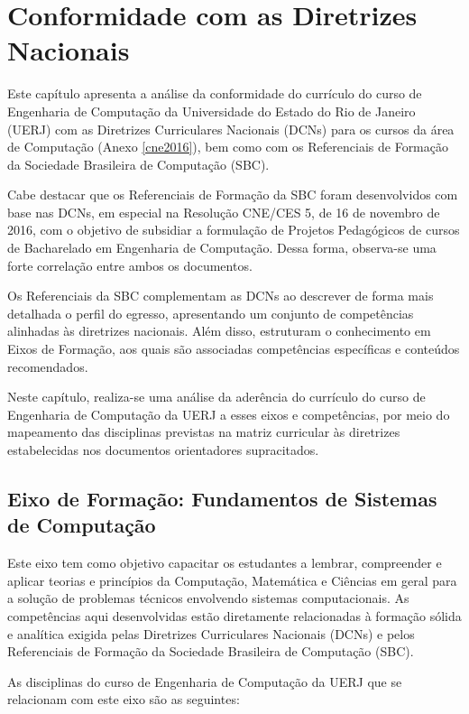 \chapter{Conformidade com as Diretrizes Nacionais}
\thispagestyle{plain}

Este capítulo apresenta a análise da conformidade do currículo do curso de Engenharia de Computação da Universidade do Estado do Rio de Janeiro (UERJ) com as Diretrizes Curriculares Nacionais (DCNs) para os cursos da área de Computação (Anexo \ref{cne2016}), bem como com os Referenciais de Formação da Sociedade Brasileira de Computação (SBC).

Cabe destacar que os Referenciais de Formação da SBC foram desenvolvidos com base nas DCNs, em especial na Resolução CNE/CES  5, de 16 de novembro de 2016, com o objetivo de subsidiar a formulação de Projetos Pedagógicos de cursos de Bacharelado em Engenharia de Computação. Dessa forma, observa-se uma forte correlação entre ambos os documentos.

Os Referenciais da SBC complementam as DCNs ao descrever de forma mais detalhada o perfil do egresso, apresentando um conjunto de competências alinhadas às diretrizes nacionais. Além disso, estruturam o conhecimento em Eixos de Formação, aos quais são associadas competências específicas e conteúdos recomendados.

Neste capítulo, realiza-se uma análise da aderência do currículo do curso de Engenharia de Computação da UERJ a esses eixos e competências, por meio do mapeamento das disciplinas previstas na matriz curricular às diretrizes estabelecidas nos documentos orientadores supracitados.

\section{Eixo de Formação: Fundamentos de Sistemas de Computação}
Este eixo tem como objetivo capacitar os estudantes a lembrar, compreender e aplicar teorias e princípios da Computação, Matemática e Ciências em geral para a solução de problemas técnicos envolvendo sistemas computacionais. As competências aqui desenvolvidas estão diretamente relacionadas à formação sólida e analítica exigida pelas Diretrizes Curriculares Nacionais (DCNs) e pelos Referenciais de Formação da Sociedade Brasileira de Computação (SBC).

As disciplinas do curso de Engenharia de Computação da UERJ que se relacionam com este eixo são as seguintes:

